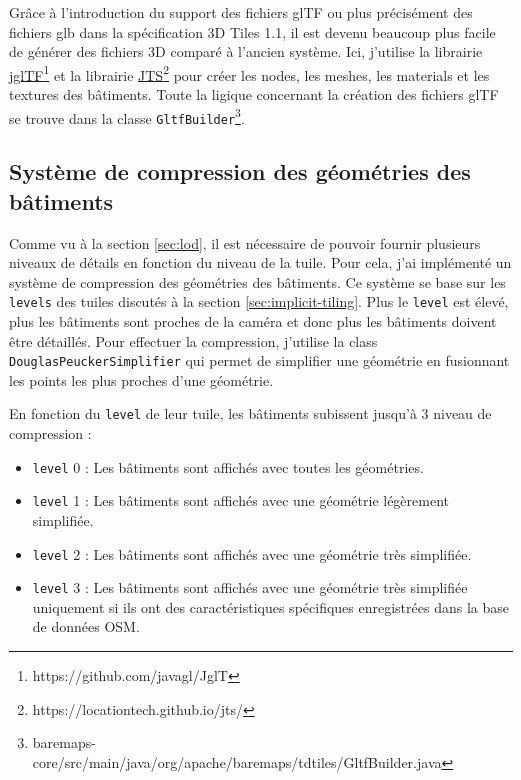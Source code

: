 Grâce à l'introduction du support des fichiers glTF ou plus précisément des fichiers glb dans la spécification 3D Tiles 1.1, il est devenu beaucoup plus facile de générer des fichiers 3D comparé à l'ancien système. Ici, j'utilise la librairie \href{https://github.com/javagl/JglTF}{jglTF}\footnote{https://github.com/javagl/JglT} et la librairie \href{https://locationtech.github.io/jts/}{JTS}\footnote{https://locationtech.github.io/jts/} pour créer les nodes, les meshes, les materials et les textures des bâtiments. Toute la ligique concernant la création des fichiers glTF se trouve dans la classe \texttt{GltfBuilder}\footnote{baremaps-core/src/main/java/org/apache/baremaps/tdtiles/GltfBuilder.java}.

\subsection{Système de compression des géométries des bâtiments}

Comme vu à la section \ref{sec:lod}, il est nécessaire de pouvoir fournir plusieurs niveaux de détails en fonction du niveau de la tuile. Pour cela, j'ai implémenté un système de compression des géométries des bâtiments. Ce système se base sur les \texttt{levels} des tuiles discutés à la section \ref{sec:implicit-tiling}. Plus le \texttt{level} est élevé, plus les bâtiments sont proches de la caméra et donc plus les bâtiments doivent être détaillés. Pour effectuer la compression, j'utilise la class \texttt{DouglasPeuckerSimplifier} qui permet de simplifier une géométrie en fusionnant les points les plus proches d'une géométrie.

En fonction du \texttt{level} de leur tuile, les bâtiments subissent jusqu'à 3 niveau de compression :

\begin{itemize}
    \item \texttt{level} 0 : Les bâtiments sont affichés avec toutes les géométries.
    \item \texttt{level} 1 : Les bâtiments sont affichés avec une géométrie légèrement simplifiée.
    \item \texttt{level} 2 : Les bâtiments sont affichés avec une géométrie très simplifiée.
    \item \texttt{level} 3 : Les bâtiments sont affichés avec une géométrie très simplifiée uniquement si ils ont des caractéristiques spécifiques enregistrées dans la base de données OSM.
\end{itemize}

